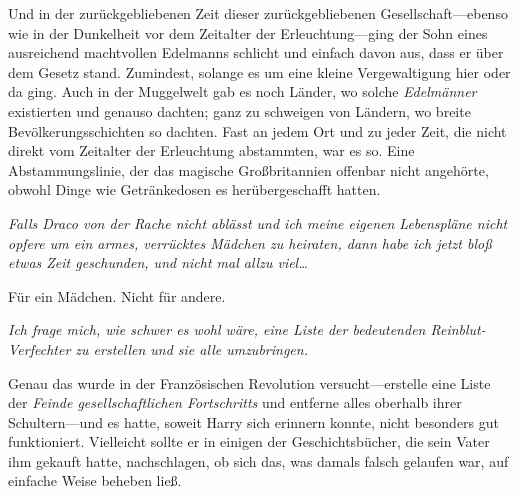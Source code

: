 Und in der zurückgebliebenen Zeit dieser zurückgebliebenen Gesellschaft—ebenso wie in der Dunkelheit vor dem Zeitalter der Erleuchtung—ging der Sohn eines ausreichend machtvollen Edelmanns schlicht und einfach davon aus, dass er über dem Gesetz stand. Zumindest, solange es um eine kleine Vergewaltigung hier oder da ging. Auch in der Muggelwelt gab es noch Länder, wo solche \emph{Edelmänner} existierten und genauso dachten; ganz zu schweigen von Ländern, wo breite Bevölkerungsschichten so dachten. Fast an jedem Ort und zu jeder Zeit, die nicht direkt vom Zeitalter der Erleuchtung abstammten, war es so. Eine Abstammungslinie, der das magische Großbritannien offenbar nicht angehörte, obwohl Dinge wie Getränkedosen es herübergeschafft hatten.

\emph{Falls Draco von der Rache nicht ablässt und ich meine eigenen Lebenspläne nicht opfere um ein armes, verrücktes Mädchen zu heiraten, dann habe ich jetzt bloß etwas Zeit geschunden, und nicht mal allzu viel…}

Für ein Mädchen. Nicht für andere.

\emph{Ich frage mich, wie schwer es wohl wäre, eine Liste der bedeutenden Reinblut-Verfechter zu erstellen und sie alle umzubringen.}

Genau das wurde in der Französischen Revolution versucht—erstelle eine Liste der \emph{Feinde gesellschaftlichen Fortschritts} und entferne alles oberhalb ihrer Schultern—und es hatte, soweit Harry sich erinnern konnte, nicht besonders gut funktioniert. Vielleicht sollte er in einigen der Geschichtsbücher, die sein Vater ihm gekauft hatte, nachschlagen, ob sich das, was damals falsch gelaufen war, auf einfache Weise beheben ließ.

